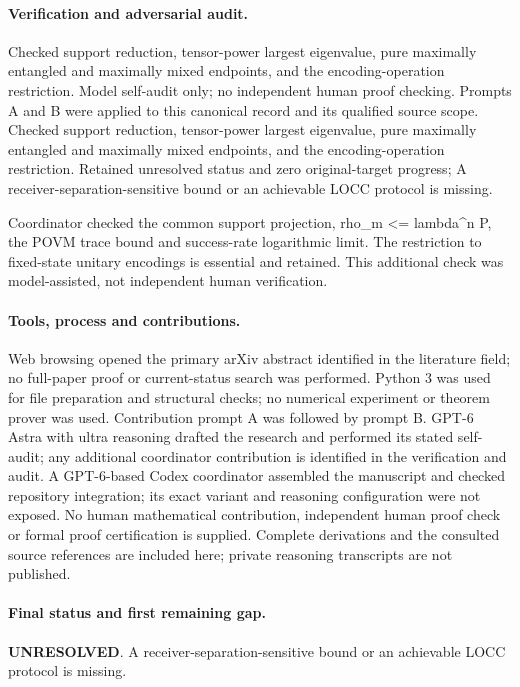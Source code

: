 \documentclass[11pt]{article}
\begin{document}
\paragraph{Verification and adversarial audit.}
Checked support reduction, tensor-power largest eigenvalue, pure maximally entangled and maximally mixed endpoints, and the encoding-operation restriction. Model self-audit only; no independent human proof checking. Prompts A and B were applied to this canonical record and its qualified source scope. Checked support reduction, tensor-power largest eigenvalue, pure maximally entangled and maximally mixed endpoints, and the encoding-operation restriction. Retained unresolved status and zero original-target progress; A receiver-separation-sensitive bound or an achievable LOCC protocol is missing.

Coordinator checked the common support projection, rho\_m <= lambda\textasciicircum{}n P, the POVM trace bound and success-rate logarithmic limit. The restriction to fixed-state unitary encodings is essential and retained. This additional check was model-assisted, not independent human verification.

\paragraph{Tools, process and contributions.}
Web browsing opened the primary arXiv abstract identified in the literature field; no full-paper proof or current-status search was performed. Python 3 was used for file preparation and structural checks; no numerical experiment or theorem prover was used. Contribution prompt A was followed by prompt B. GPT-6 Astra with ultra reasoning drafted the research and performed its stated self-audit; any additional coordinator contribution is identified in the verification and audit. A GPT-6-based Codex coordinator assembled the manuscript and checked repository integration; its exact variant and reasoning configuration were not exposed. No human mathematical contribution, independent human proof check or formal proof certification is supplied. Complete derivations and the consulted source references are included here; private reasoning transcripts are not published.

\paragraph{Final status and first remaining gap.}
\textbf{UNRESOLVED}. A receiver-separation-sensitive bound or an achievable LOCC protocol is missing.
\end{document}
